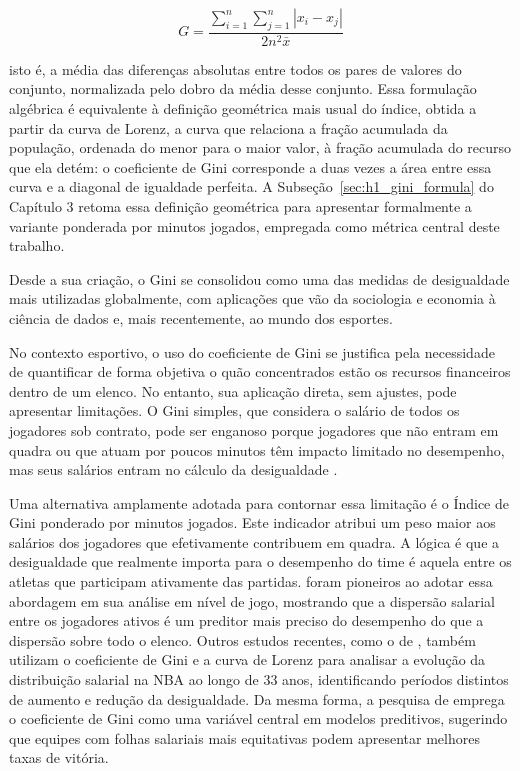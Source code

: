 \begin{equation}
G = \frac{\sum_{i=1}^{n} \sum_{j=1}^{n} |x_i - x_j|}{2n^2\bar{x}}
\label{eq:gini}
\end{equation}

isto é, a média das diferenças absolutas entre todos os pares de valores do conjunto, normalizada pelo dobro da média desse conjunto. Essa formulação algébrica é equivalente à definição geométrica mais usual do índice, obtida a partir da curva de Lorenz, a curva que relaciona a fração acumulada da população, ordenada do menor para o maior valor, à fração acumulada do recurso que ela detém: o coeficiente de Gini corresponde a duas vezes a área entre essa curva e a diagonal de igualdade perfeita. A Subseção~\ref{sec:h1_gini_formula} do Capítulo 3 retoma essa definição geométrica para apresentar formalmente a variante ponderada por minutos jogados, empregada como métrica central deste trabalho.

Desde a sua criação, o Gini se consolidou como uma das medidas de desigualdade mais utilizadas globalmente, com aplicações que vão da sociologia e economia à ciência de dados e, mais recentemente, ao mundo dos esportes.

No contexto esportivo, o uso do coeficiente de Gini se justifica pela necessidade de quantificar de forma objetiva o quão concentrados estão os recursos financeiros dentro de um elenco. No entanto, sua aplicação direta, sem ajustes, pode apresentar limitações. O Gini simples, que considera o salário de todos os jogadores sob contrato, pode ser enganoso porque jogadores que não entram em quadra ou que atuam por poucos minutos têm impacto limitado no desempenho, mas seus salários entram no cálculo da desigualdade \citep{larsen2006}.

Uma alternativa amplamente adotada para contornar essa limitação é o Índice de Gini ponderado por minutos jogados. Este indicador atribui um peso maior aos salários dos jogadores que efetivamente contribuem em quadra. A lógica é que a desigualdade que realmente importa para o desempenho do time é aquela entre os atletas que participam ativamente das partidas. \citet{katayama2011} foram pioneiros ao adotar essa abordagem em sua análise em nível de jogo, mostrando que a dispersão salarial entre os jogadores ativos é um preditor mais preciso do desempenho do que a dispersão sobre todo o elenco. Outros estudos recentes, como o de \citet{strazicich2024}, também utilizam o coeficiente de Gini e a curva de Lorenz para analisar a evolução da distribuição salarial na NBA ao longo de 33 anos, identificando períodos distintos de aumento e redução da desigualdade. Da mesma forma, a pesquisa de \citet{plante2025} emprega o coeficiente de Gini como uma variável central em modelos preditivos, sugerindo que equipes com folhas salariais mais equitativas podem apresentar melhores taxas de vitória.

